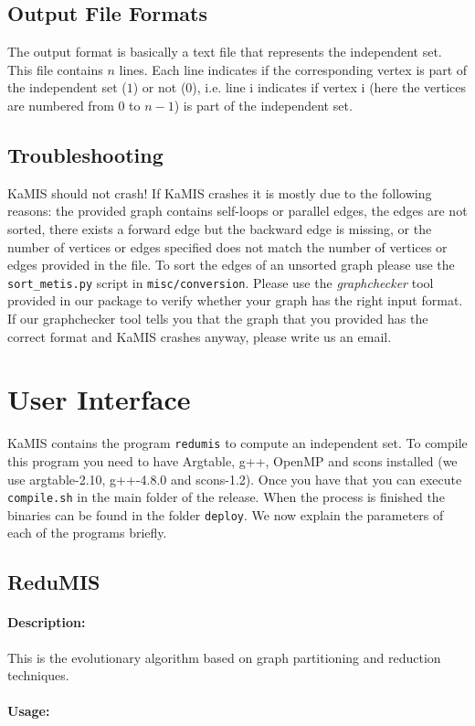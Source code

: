 \documentclass[11pt]{article}
\begin{document}
\subsection{Output File Formats}
The output format is basically a text file that represents the independent set. 
This file contains $n$ lines. 
Each line indicates if the corresponding vertex is part of the independent set ($1$) or not ($0$), i.e. line i indicates if vertex i (here the vertices are numbered from $0$ to $n-1$) is part of the independent set. 
\subsection{Troubleshooting}
KaMIS should not crash! If KaMIS crashes it is mostly due to the following reasons: the provided graph contains self-loops or parallel edges, the edges are not sorted, there exists a forward edge but the backward edge is missing, or the number of vertices or edges specified does not match the number of vertices or edges provided in the file.
To sort the edges of an unsorted graph please use the \texttt{sort\_metis.py} script in \texttt{misc/conversion}.
Please use the \emph{graphchecker} tool provided in our package to verify whether your graph has the right input format. 
If our graphchecker tool tells you that the graph that you provided has the correct format and KaMIS crashes anyway, please write us an email.

\vfill
\pagebreak
\section{User Interface}
KaMIS contains the program \texttt{redumis} to compute an independent set. 
To compile this program you need to have Argtable, g++, OpenMP and scons installed (we use argtable-2.10, g++-4.8.0 and scons-1.2). 
Once you have that you can execute \texttt{compile.sh} in the main folder of the release. 
When the process is finished the binaries can be found in the folder \texttt{deploy}. We now explain the parameters of each of the programs briefly.
\subsection{ReduMIS}
\paragraph*{Description:} This is the evolutionary algorithm based on graph partitioning and reduction techniques. 
\paragraph*{Usage:\\} 
\end{document}

